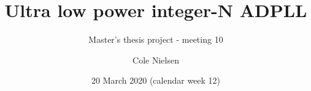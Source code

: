 \documentclass[t, screen, aspectratio=43]{beamer}
\title[Short title]{Ultra low power integer-N ADPLL}
\subtitle{Master's thesis project - meeting 10}
\author[C Nielsen]{Cole Nielsen}
\institute[NTNU]{Department of Electronic Systems, NTNU}
\date{20 March 2020  (calendar week 12)}
\newcommand*\mycirc[1]{%
\begin{tikzpicture}[baseline=(C.base)]
	\node[draw,circle,inner sep=1pt,minimum size=3ex](C){#1};
\end{tikzpicture}}
\begin{document}
\begin{frame}
	\titlepage%
\end{frame}










\end{document}
